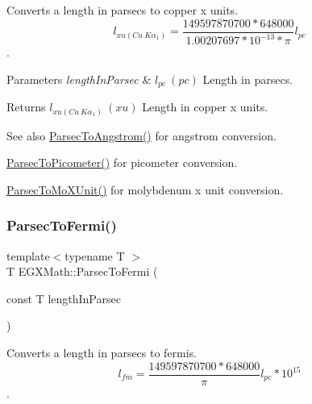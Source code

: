 Converts a length in parsecs to copper x units. \[ l_{xu(Cu\ K\alpha_1)}= \frac{149597870700 * 648000}{1.00207697*10^{-13} * \pi} l_{pc}\]. 


\begin{DoxyParams}{Parameters}
{\em length\+In\+Parsec} & $ l_{pc}\ (pc)$ Length in parsecs. \\
\hline
\end{DoxyParams}
\begin{DoxyReturn}{Returns}
$ l_{xu(Cu\ K\alpha_1)}\ (xu)$ Length in copper x units. 
\end{DoxyReturn}
\begin{DoxySeeAlso}{See also}
\mbox{\hyperlink{group___e_g_x_math-_conversions-_length_conversions-_astronomical-_parsec-_non-_s_i_gae9721658cb4d8b9e1cfd85f20d646702}{Parsec\+To\+Angstrom()}} for angstrom conversion. 

\mbox{\hyperlink{group___e_g_x_math-_conversions-_length_conversions-_astronomical-_parsec-_s_i_ga2d56b414320940d42a8956239e54c8b0}{Parsec\+To\+Picometer()}} for picometer conversion. 

\mbox{\hyperlink{group___e_g_x_math-_conversions-_length_conversions-_astronomical-_parsec-_non-_s_i_gaf076c4eb125bbc9fbabc040300961b6d}{Parsec\+To\+Mo\+X\+Unit()}} for molybdenum x unit conversion. 
\end{DoxySeeAlso}
\mbox{\label{group___e_g_x_math-_conversions-_length_conversions-_astronomical-_parsec-_non-_s_i_gac157e45cbd0a0ef15a52dcc59a7b40ad}} 
\subsubsection{\texorpdfstring{Parsec\+To\+Fermi()}{ParsecToFermi()}}
{\footnotesize\ttfamily template$<$typename T $>$ \\
T E\+G\+X\+Math\+::\+Parsec\+To\+Fermi (\begin{DoxyParamCaption}\item[{const T}]{length\+In\+Parsec }\end{DoxyParamCaption})}



Converts a length in parsecs to fermis. \[ l_{fm}=\frac{149597870700 * 648000}{\pi}l_{pc} * 10^{15} \]. 


